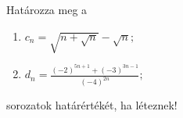 \documentclass[11pt]{scrartcl}
\begin{document}
Határozza meg a
\begin{enumerate}
	\item \(\displaystyle
	      c_n = \sqrt{n + \sqrt{n}} - \sqrt{n};
	      \)

	\item \(\displaystyle
	      d_n = \frac{(-2)^{5n + 1} + (-3)^{3n - 1}}{(-4)^{2n}};
	      \)
\end{enumerate}
sorozatok határértékét, ha léteznek!
\end{document}
